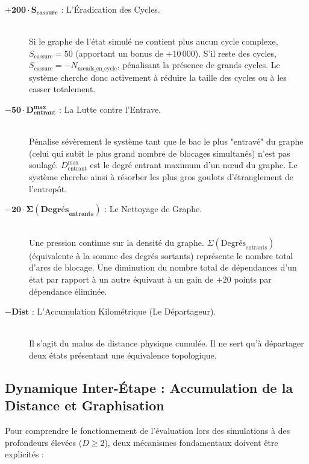\documentclass[11pt,a4paper]{article}
\begin{document}
\begin{description}
    \item[$\mathbf{+200 \cdot S_{\text{cassure}}}$ : L'Éradication des Cycles.] \hfill \\
    Si le graphe de l'état simulé ne contient plus aucun cycle complexe, $S_{\text{cassure}} = 50$ (apportant un bonus de $+10\,000$). S'il reste des cycles, $S_{\text{cassure}} = -N_{\text{nœuds\_en\_cycle}}$, pénalisant la présence de grands cycles. Le système cherche donc activement à réduire la taille des cycles ou à les casser totalement.

    \item[$\mathbf{-50 \cdot D^{\text{max}}_{\text{entrant}}}$ : La Lutte contre l'Entrave.] \hfill \\
    Pénalise sévèrement le système tant que le bac le plus "entravé" du graphe (celui qui subit le plus grand nombre de blocages simultanés) n'est pas soulagé. $D^{\text{max}}_{\text{entrant}}$ est le degré entrant maximum d'un nœud du graphe. Le système cherche ainsi à résorber les plus gros goulots d'étranglement de l'entrepôt.

    \item[$\mathbf{-20 \cdot \Sigma(\text{Degrés}_{\text{entrants}})}$ : Le Nettoyage de Graphe.] \hfill \\
    Une pression continue sur la densité du graphe. $\Sigma(\text{Degrés}_{\text{entrants}})$ (équivalente à la somme des degrés sortants) représente le nombre total d'arcs de blocage. Une diminution du nombre total de dépendances d'un état par rapport à un autre équivaut à un gain de $+20$ points par dépendance éliminée.

    \item[$\mathbf{-\text{Dist}}$ : L'Accumulation Kilométrique (Le Départageur).] \hfill \\
    Il s'agit du malus de distance physique cumulée. Il ne sert qu'à départager deux états présentant une équivalence topologique.
\end{description}

\subsection{Dynamique Inter-Étape : Accumulation de la Distance et Graphisation}
Pour comprendre le fonctionnement de l'évaluation lors des simulations à des profondeurs élevées ($D \ge 2$), deux mécanismes fondamentaux doivent être explicités :
\end{document}
